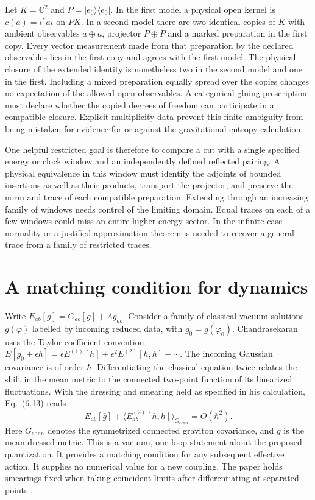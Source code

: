 \documentclass[11pt,letterpaper]{article}
\begin{document}
Let \(K=\mathbb C^2\) and \(P=|e_0\rangle\langle e_0|\).
In the first model a physical open kernel is \(c(a)=\iota^*a\iota\)
on \(PK\). In a second model there are two identical copies of \(K\)
with ambient observables \(a\oplus a\), projector \(P\oplus P\) and
a marked preparation in the first copy. Every vector measurement
made from that preparation by the declared observables lies in the
first copy and agrees with the first model. The physical closure of
the extended identity is nonetheless two in the second model and one
in the first. Including a mixed preparation equally spread over the
copies changes no expectation of the allowed open observables.
A categorical gluing prescription must declare whether the copied
degrees of freedom can participate in a compatible closure. Explicit
multiplicity data prevent this finite ambiguity from being mistaken
for evidence for or against the gravitational entropy calculation.

One helpful restricted goal is therefore to compare a cut with a single
specified energy or clock window and an independently defined reflected
pairing. A physical equivalence in this window must identify the
adjoints of bounded insertions as well as their products, transport
the projector, and preserve the norm and trace of each compatible
preparation. Extending through an increasing family of windows needs
control of the limiting domain. Equal traces on each of a few windows
could miss an entire higher-energy sector. In the infinite case
normality or a justified approximation theorem is needed to recover
a general trace from a family of restricted traces.

\section{A matching condition for dynamics}
Write $E_{ab}[g]=G_{ab}[g]+\Lambda g_{ab}$. Consider a family of classical vacuum solutions $g(\varphi)$ labelled by incoming reduced data, with $g_0=g(\varphi_0)$. Chandrasekaran uses the Taylor coefficient convention $E[g_0+\epsilon h]=\epsilon E^{(1)}[h]+\epsilon^2 E^{(2)}[h,h]+\cdots$. The incoming Gaussian covariance is of order $\hbar$. Differentiating the classical equation twice relates the shift in the mean metric to the connected two-point function of its linearized fluctuations. With the dressing and smearing held as specified in his calculation, Eq.~(6.13) reads
\begin{equation}
 E_{ab}[\bar g]+\langle E^{(2)}_{ab}[h,h]\rangle_{G_{\mathrm{conn}}}
 = O(\hbar^2).                                      \label{eq:vac}
\end{equation}
Here $G_{\mathrm{conn}}$ denotes the symmetrized connected graviton covariance, and $\bar g$ is the mean dressed metric. This is a vacuum, one-loop statement about the proposed quantization. It provides a matching condition for any subsequent effective action. It supplies no numerical value for a new coupling. The paper holds smearings fixed when taking coincident limits after differentiating at separated points \cite[Eq.~(6.14)]{nc}.
\end{document}
